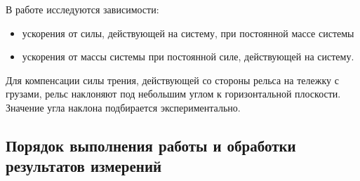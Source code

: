 \documentclass[a4paper, 12pt]{extarticle}
\begin{document}
В работе исследуются зависимости:
\begin{itemize}
\item ускорения от силы, действующей на систему, при постоянной массе системы
\item ускорения от массы системы при постоянной силе, действующей на систему. %
\end{itemize}

Для компенсации силы трения, действующей со стороны рельса на тележку с грузами, рельс наклоняют под небольшим углом к горизонтальной плоскости. Значение угла наклона подбирается экспериментально.

\subsection{Порядок выполнения работы и обработки результатов измерений}
\end{document}
